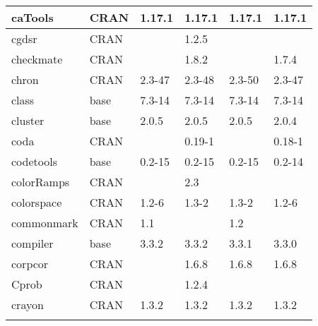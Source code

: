 \begin{longtable}{|llllll|}
caTools                       & CRAN                      & 1.17.1      & 1.17.1      & 1.17.1         & 1.17.1            \\ \hline \rowcolor{gray!25}
cgdsr                         & CRAN                      &             & 1.2.5       &                &                  \\ \hline
checkmate                     & CRAN                      &             & 1.8.2       &                & 1.7.4             \\ \hline \rowcolor{gray!25}
chron                         & CRAN                      & 2.3-47      & 2.3-48      & 2.3-50         & 2.3-47           \\ \hline
class                         & base                      & 7.3-14      & 7.3-14      & 7.3-14         & 7.3-14            \\ \hline \rowcolor{gray!25}
cluster                       & base                      & 2.0.5       & 2.0.5       & 2.0.5          & 2.0.4            \\ \hline
coda                          & CRAN                      &             & 0.19-1      &                & 0.18-1            \\ \hline \rowcolor{gray!25}
codetools                     & base                      & 0.2-15      & 0.2-15      & 0.2-15         & 0.2-14           \\ \hline
colorRamps                    & CRAN                      &             & 2.3         &                &                   \\ \hline \rowcolor{gray!25}
colorspace                    & CRAN                      & 1.2-6       & 1.3-2       & 1.3-2          & 1.2-6            \\ \hline
commonmark                    & CRAN                      & 1.1         &             & 1.2            &                   \\ \hline \rowcolor{gray!25}
compiler                      & base                      & 3.3.2       & 3.3.2       & 3.3.1          & 3.3.0            \\ \hline
corpcor                       & CRAN                      &             & 1.6.8       & 1.6.8          & 1.6.8             \\ \hline \rowcolor{gray!25}
Cprob                         & CRAN                      &             & 1.2.4       &                &                  \\ \hline
crayon                        & CRAN                      & 1.3.2       & 1.3.2       & 1.3.2          & 1.3.2             \\ \hline \rowcolor{gray!25}

\end{longtable}
